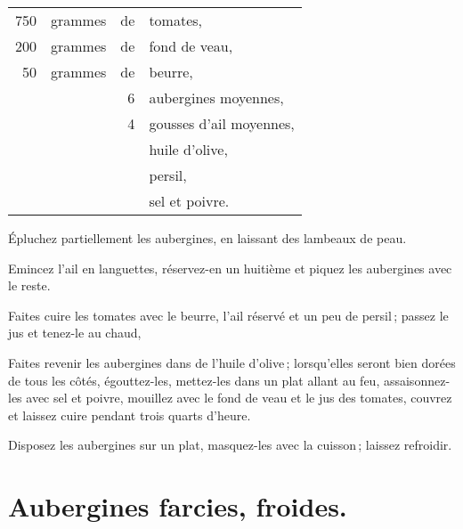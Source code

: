 \footnotesize
\begin{longtable}{rrrp{16em}}
    750 & grammes & de & tomates,                                                                         \\
    200 & grammes & de & fond de veau,                                                                    \\
     50 & grammes & de & beurre,                                                                          \\
        &         &  6 & aubergines moyennes,                                                             \\
        &         &  4 & gousses d'ail moyennes,                                                          \\
        &         &    & huile d'olive,                                                                   \\
        &         &    & persil,                                                                          \\
        &         &    & sel et poivre.                                                                   \\
\end{longtable}
\normalsize

Épluchez partiellement les aubergines, en laissant des lambeaux de peau.

Emincez l'ail en languettes, réservez-en un huitième et piquez les aubergines
avec le reste.

Faites cuire les tomates avec le beurre, l'ail réservé et un peu de persil ;
passez le jus et tenez-le au chaud,

Faites revenir les aubergines dans de l'huile d'olive ; lorsqu'elles seront
bien dorées de tous les côtés, égouttez-les, mettez-les dans un plat allant au
feu, assaisonnez-les avec sel et poivre, mouillez avec le fond de veau et le
jus des tomates, couvrez et laissez cuire pendant trois quarts d'heure.

Disposez les aubergines sur un plat, masquez-les avec la cuisson ; laissez
refroidir.

\section*{\centering Aubergines farcies, froides.}
{}

